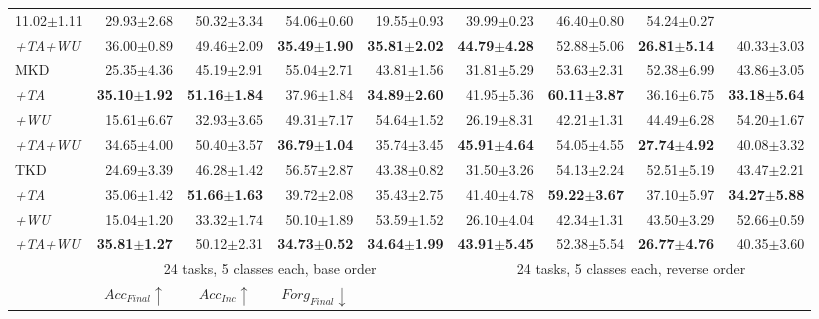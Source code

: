 \begin{appendix}
\begin{table*}
{\begin{tabular}{@{}lrrrrrrrr@{}}
  11.02$\pm$1.11 &
  29.93$\pm$2.68 &
  50.32$\pm$3.34 &
  54.06$\pm$0.60 &
  19.55$\pm$0.93 &
  39.99$\pm$0.23 &
  46.40$\pm$0.80 &
  54.24$\pm$0.27 \\
\textit{+TA+WU} &
  36.00$\pm$0.89 &
  49.46$\pm$2.09 &
  \textbf{35.49$\pm$1.90} &
  \textbf{35.81$\pm$2.02} &
  \textbf{44.79$\pm$4.28} &
  52.88$\pm$5.06 &
  \textbf{26.81$\pm$5.14} &
  40.33$\pm$3.03 \\ \midrule
MKD &
  25.35$\pm$4.36 &
  45.19$\pm$2.91 &
  55.04$\pm$2.71 &
  43.81$\pm$1.56 &
  31.81$\pm$5.29 &
  53.63$\pm$2.31 &
  52.38$\pm$6.99 &
  43.86$\pm$3.05 \\
\textit{+TA} &
  \textbf{35.10$\pm$1.92} &
  \textbf{51.16$\pm$1.84} &
  37.96$\pm$1.84 &
  \textbf{34.89$\pm$2.60} &
  41.95$\pm$5.36 &
  \textbf{60.11$\pm$3.87} &
  36.16$\pm$6.75 &
  \textbf{33.18$\pm$5.64} \\
\textit{+WU} &
  15.61$\pm$6.67 &
  32.93$\pm$3.65 &
  49.31$\pm$7.17 &
  54.64$\pm$1.52 &
  26.19$\pm$8.31 &
  42.21$\pm$1.31 &
  44.49$\pm$6.28 &
  54.20$\pm$1.67 \\
\textit{+TA+WU} &
  34.65$\pm$4.00 &
  50.40$\pm$3.57 &
  \textbf{36.79$\pm$1.04} &
  35.74$\pm$3.45 &
  \textbf{45.91$\pm$4.64} &
  54.05$\pm$4.55 &
  \textbf{27.74$\pm$4.92} &
  40.08$\pm$3.32 \\ \midrule
TKD &
  24.69$\pm$3.39 &
  46.28$\pm$1.42 &
  56.57$\pm$2.87 &
  43.38$\pm$0.82 &
  31.50$\pm$3.26 &
  54.13$\pm$2.24 &
  52.51$\pm$5.19 &
  43.47$\pm$2.21 \\
\textit{+TA} &
  35.06$\pm$1.42 &
  \textbf{51.66$\pm$1.63} &
  39.72$\pm$2.08 &
  35.43$\pm$2.75 &
  41.40$\pm$4.78 &
  \textbf{59.22$\pm$3.67} &
  37.10$\pm$5.97 &
  \textbf{34.27$\pm$5.88} \\
\textit{+WU} &
  15.04$\pm$1.20 &
  33.32$\pm$1.74 &
  50.10$\pm$1.89 &
  53.59$\pm$1.52 &
  26.10$\pm$4.04 &
  42.34$\pm$1.31 &
  43.50$\pm$3.29 &
  52.66$\pm$0.59 \\
\textit{+TA+WU} &
  \textbf{35.81$\pm$1.27} &
  50.12$\pm$2.31 &
  \textbf{34.73$\pm$0.52} &
  \textbf{34.64$\pm$1.99} &
  \textbf{43.91$\pm$5.45} &
  52.38$\pm$5.54 &
  \textbf{26.77$\pm$4.76} &
  40.35$\pm$3.60 \\
  \midrule
\textit{} &
  \multicolumn{4}{c}{24 tasks, 5 classes each, base order} &
  \multicolumn{4}{c}{24 tasks, 5 classes each, reverse order} \\ \cmidrule{2-9}
 &
\multicolumn{1}{c}{$Acc_{Final} \uparrow$} &
  \multicolumn{1}{c}{$Acc_{Inc} \uparrow$} &
  \multicolumn{1}{c}{$Forg_{Final} \downarrow$} &

\end{tabular}}
\end{table*}
\end{appendix}
